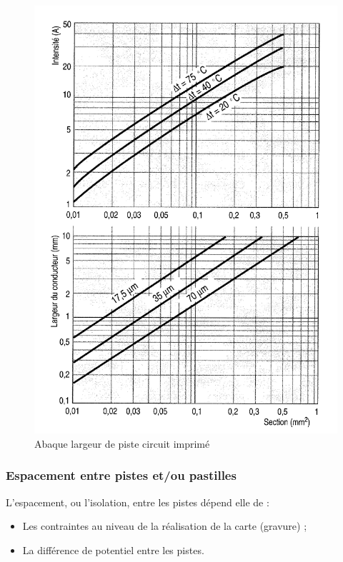 \documentclass[a4paper]{article}
\begin{document}
\begin{figure}[H]
	\centering
	\includegraphics[scale=0.85]{Images/Abaque_largeur_piste}
	\caption{Abaque largeur de piste circuit imprimé
		\label{Abaque_largeur_piste}}
\end{figure}

\subsubsection{Espacement entre pistes et/ou pastilles}

L'espacement, ou l'isolation, entre les pistes dépend elle de :

\begin{itemize}
	\item Les contraintes au niveau de la réalisation de la carte (gravure) ;
	\item La différence de potentiel entre les pistes.
\end{itemize}
\end{document}
